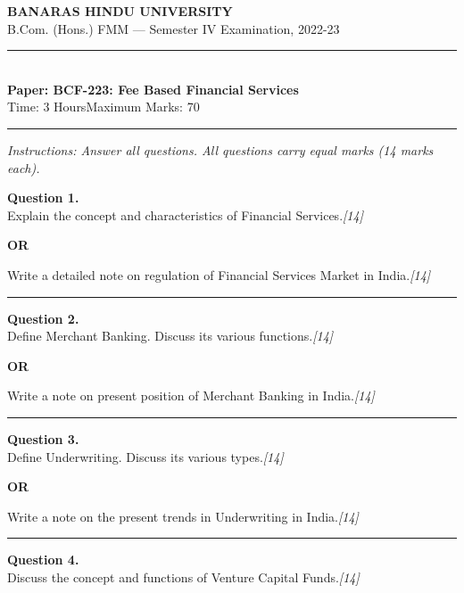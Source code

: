 \documentclass[11pt,a4paper]{article}
\newcommand{\pts}[1]{\hfill   \textit{[#1]}}
\begin{document}
\begin{center}
  {\large\bfseries BANARAS HINDU UNIVERSITY}\\[2pt]
  {\normalsize B.Com. (Hons.) FMM --- Semester IV Examination, 2022-23}\\[6pt]
  \rule{0.8\linewidth}{0.5pt}\\[6pt]
  {\large\bfseries Paper: BCF-223: Fee Based Financial Services}\\[4pt]
  {\normalsize Time: 3 Hours\hfill Maximum Marks: 70}
\end{center}

\rule{\linewidth}{0.4pt}

\smallskip



\noindent   \textit{Instructions: Answer all questions. All questions carry equal marks (14 marks each).}

\bigskip




\noindent   \textbf{Question 1.} \\
Explain the concept and characteristics of Financial Services.\pts{14}

\centerline{   \textbf{OR}}

Write a detailed note on regulation of Financial Services Market in India.\pts{14}

\medskip\rule{\linewidth}{0.2pt}




\noindent   \textbf{Question 2.} \\
Define Merchant Banking. Discuss its various functions.\pts{14}

\centerline{   \textbf{OR}}

Write a note on present position of Merchant Banking in India.\pts{14}

\medskip\rule{\linewidth}{0.2pt}




\noindent   \textbf{Question 3.} \\
Define Underwriting. Discuss its various types.\pts{14}

\centerline{   \textbf{OR}}

Write a note on the present trends in Underwriting in India.\pts{14}

\medskip\rule{\linewidth}{0.2pt}




\noindent   \textbf{Question 4.} \\
Discuss the concept and functions of Venture Capital Funds.\pts{14}
\end{document}
